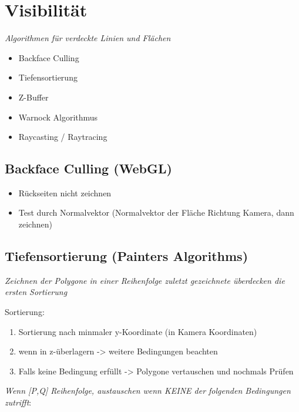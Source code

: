\section{Visibilität}

\textit{Algorithmen für verdeckte Linien und Flächen}

\begin{itemize}
  \item Backface Culling
  \item Tiefensortierung
  \item Z-Buffer
  \item Warnock Algorithmus
  \item Raycasting / Raytracing
\end{itemize}

\subsection{Backface Culling (WebGL)}

\begin{itemize}
  \item Rückseiten nicht zeichnen
  \item Test durch Normalvektor (Normalvektor der Fläche Richtung Kamera, dann zeichnen)
\end{itemize}

\subsection{Tiefensortierung (Painters Algorithms)}

\textit{Zeichnen der Polygone in einer Reihenfolge zuletzt gezeichnete überdecken die ersten Sortierung}

Sortierung:
\begin{enumerate}
  \item Sortierung nach minmaler y-Koordinate (in Kamera Koordinaten)
  \item wenn in z-überlagern -> weitere Bedingungen beachten
  \item Falls keine Bedingung erfüllt -> Polygone vertauschen und nochmals Prüfen
\end{enumerate}

\textit{Wenn [P,Q] Reihenfolge, austauschen wenn KEINE der folgenden Bedingungen zutrifft}:\\

